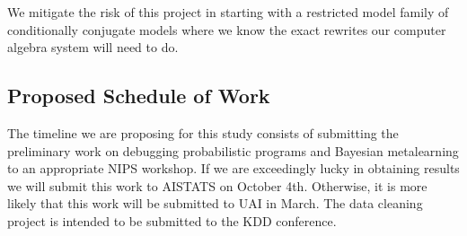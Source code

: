 \documentclass[12pt]{article}
\theoremstyle{definition}
\begin{document}
We mitigate the risk of this project in starting with a restricted
model family of conditionally conjugate models where we know the
exact rewrites our computer algebra system will need to do.

\subsection{Proposed Schedule of Work}

The timeline we are proposing for this study consists of submitting
the preliminary work on debugging probabilistic programs and Bayesian
metalearning to an appropriate NIPS workshop. If we are exceedingly
lucky in obtaining results we will submit this work to AISTATS on
October 4th. Otherwise, it is more likely that this work will be
submitted to UAI in March. The data cleaning project is intended to be
submitted to the KDD conference.
\end{document}
